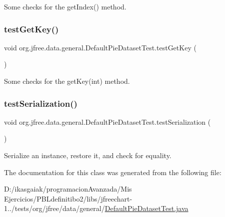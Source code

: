 Some checks for the get\+Index() method. \mbox{\label{classorg_1_1jfree_1_1data_1_1general_1_1_default_pie_dataset_test_a2527670468aa2d6141a4256988a7bf59}} 
\subsubsection{\texorpdfstring{test\+Get\+Key()}{testGetKey()}}
{\footnotesize\ttfamily void org.\+jfree.\+data.\+general.\+Default\+Pie\+Dataset\+Test.\+test\+Get\+Key (\begin{DoxyParamCaption}{ }\end{DoxyParamCaption})}

Some checks for the get\+Key(int) method. \mbox{\label{classorg_1_1jfree_1_1data_1_1general_1_1_default_pie_dataset_test_a8c0cd621331661d2c76b0c43df5d4100}} 
\subsubsection{\texorpdfstring{test\+Serialization()}{testSerialization()}}
{\footnotesize\ttfamily void org.\+jfree.\+data.\+general.\+Default\+Pie\+Dataset\+Test.\+test\+Serialization (\begin{DoxyParamCaption}{ }\end{DoxyParamCaption})}

Serialize an instance, restore it, and check for equality. 

The documentation for this class was generated from the following file\+:\begin{DoxyCompactItemize}
\item 
D\+:/ikasgaiak/programacion\+Avanzada/\+Mis Ejercicios/\+P\+B\+Ldefinitibo2/libs/jfreechart-\/1../tests/org/jfree/data/general/\mbox{\hyperlink{_default_pie_dataset_test_8java}{Default\+Pie\+Dataset\+Test.\+java}}\end{DoxyCompactItemize}
